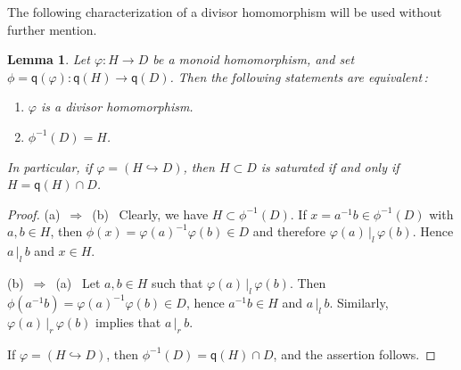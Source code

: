 \documentclass[a4paper]{amsart}
\newtheorem{lemma}[theorem]{Lemma}
\theoremstyle{definition}
\numberwithin{equation}{section}
\begin{document}
\smallskip
The following characterization of a divisor homomorphism will be
used without further mention.

\medskip
\begin{lemma} \label{4.8}
Let $\varphi \colon H \to D$ be a monoid homomorphism, and set $\phi
= \mathsf q (\varphi) \colon \mathsf q (H) \to \mathsf q (D)$. Then
the following statements are equivalent{\rm \,:}
\begin{enumerate}
\item[(a)] $\varphi$ is a divisor homomorphism.

\item[(b)] $\phi^{-1} (D) = H$.
\end{enumerate}
In particular, if $\varphi = (H \hookrightarrow D)$, then $H \subset
D$ is saturated if and only if $H = \mathsf q (H) \cap D$.
\end{lemma}

\begin{proof}
(a) \,$\Rightarrow$\, (b) \ Clearly, we have $H \subset \phi^{-1}
(D)$. If $x = a^{-1}b \in \phi^{-1} (D)$ with $a, b \in H$, then
$\phi (x) = \varphi (a)^{-1} \varphi (b) \in D$ and therefore
$\varphi (a) {\, |_l \,} \varphi (b)$. Hence $a {\, |_l \,} b$ and $x \in H$.

\smallskip
(b) \,$\Rightarrow$\, (a) \ Let $a, b \in H$ such that $\varphi (a)
{\, |_l \,} \varphi (b)$. Then $\phi (a^{-1}b) = \varphi (a)^{-1} \varphi
(b) \in D$, hence $a^{-1}b \in H$ and $a {\, |_l \,} b$. Similarly, $\varphi
(a) {\, |_r \,} \varphi (b)$ implies that $a {\, |_r \,} b$.

\smallskip
If $\varphi = (H \hookrightarrow D)$, then $\phi^{-1} (D) = \mathsf
q (H) \cap D$, and the assertion follows.
\end{proof}
\end{document}
